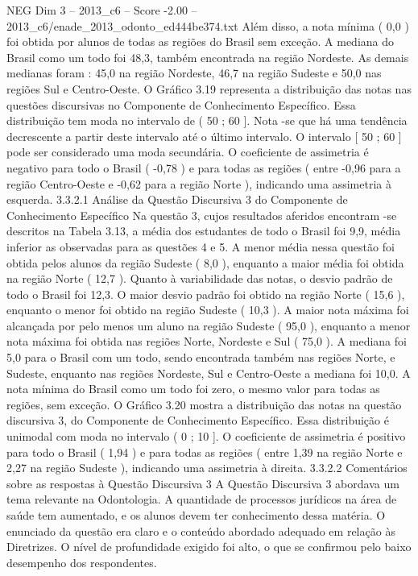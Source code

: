 \begin{textsample}{NEG Dim 3 – 2013\_c6 – Score -2.00 – 2013\_c6/enade\_2013\_odonto\_ed444be374.txt}
Além disso, a nota mínima ( 0,0 ) foi obtida por alunos de todas as regiões do Brasil sem exceção.
A mediana do Brasil como um todo foi 48,3, também encontrada na região Nordeste.
As demais medianas foram : 45,0 na região Nordeste, 46,7 na região Sudeste e 50,0 nas regiões Sul e Centro-Oeste.
O Gráfico 3.19 representa a distribuição das notas nas questões discursivas no Componente de Conhecimento Específico.
Essa distribuição tem moda no intervalo de ( 50 ; 60 ].
Nota -se que há uma tendência decrescente a partir deste intervalo até o último intervalo.
O intervalo [ 50 ; 60 ] pode ser considerado uma moda secundária.
O coeficiente de assimetria é negativo para todo o Brasil ( -0,78 ) e para todas as regiões ( entre -0,96 para a região Centro-Oeste e -0,62 para a região Norte ), indicando uma assimetria à esquerda. 3.3.2.1 Análise da Questão Discursiva 3 do Componente de Conhecimento Específico Na questão 3, cujos resultados aferidos encontram -se descritos na Tabela 3.13, a média dos estudantes de todo o Brasil foi 9,9, média inferior as observadas para as questões 4 e 5.
A menor média nessa questão foi obtida pelos alunos da região Sudeste ( 8,0 ), enquanto a maior média foi obtida na região Norte ( 12,7 ).
Quanto à variabilidade das notas, o desvio padrão de todo o Brasil foi 12,3.
O maior desvio padrão foi obtido na região Norte ( 15,6 ), enquanto o menor foi obtido na região Sudeste ( 10,3 ).
A maior nota máxima foi alcançada por pelo menos um aluno na região Sudeste ( 95,0 ), enquanto a menor nota máxima foi obtida nas regiões Norte, Nordeste e Sul ( 75,0 ).
A mediana foi 5,0 para o Brasil com um todo, sendo encontrada também nas regiões Norte, e Sudeste, enquanto nas regiões Nordeste, Sul e Centro-Oeste a mediana foi 10,0.
A nota mínima do Brasil como um todo foi zero, o mesmo valor para todas as regiões, sem exceção.
O Gráfico 3.20 mostra a distribuição das notas na questão discursiva 3, do Componente de Conhecimento Específico.
Essa distribuição é unimodal com moda no intervalo ( 0 ; 10 ].
O coeficiente de assimetria é positivo para todo o Brasil ( 1,94 ) e para todas as regiões ( entre 1,39 na região Norte e 2,27 na região Sudeste ), indicando uma assimetria à direita. 3.3.2.2 Comentários sobre as respostas à Questão Discursiva 3 A Questão Discursiva 3 abordava um tema relevante na Odontologia.
A quantidade de processos jurídicos na área de saúde tem aumentado, e os alunos devem ter conhecimento dessa matéria.
O enunciado da questão era claro e o conteúdo abordado adequado em relação às Diretrizes.
O nível de profundidade exigido foi alto, o que se confirmou pelo baixo desempenho dos respondentes.

\end{textsample}
